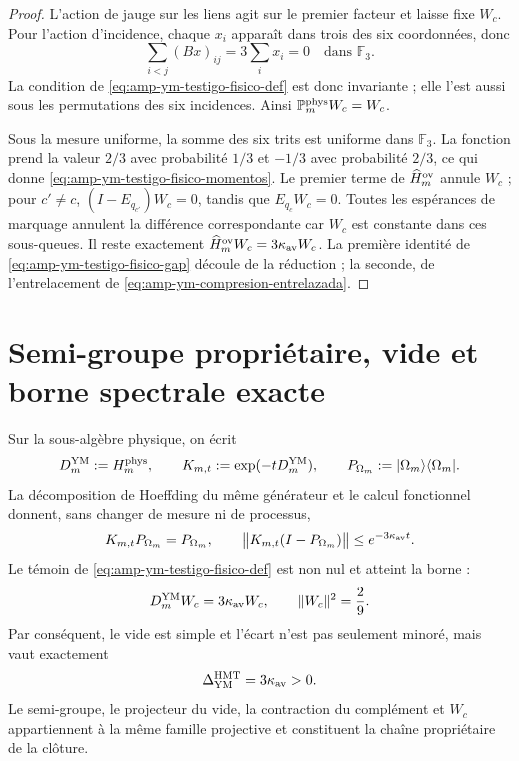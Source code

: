 \begin{proof}
L’action de jauge sur les liens agit sur le premier facteur et laisse fixe
\(W_c\). Pour l’action d’incidence, chaque \(x_i\) apparaît dans trois des
six coordonnées, donc
\[
 \sum_{i<j}(Bx)_{ij}=3\sum_i x_i=0
 \quad\text{dans }\mathbb F_3.
\]
La condition de \eqref{eq:amp-ym-testigo-fisico-def} est donc
invariante ; elle l’est aussi sous les permutations des six incidences.
Ainsi \(\mathbb P_m^{\rm phys}W_c=W_c\).

Sous la mesure uniforme, la somme des six trits est uniforme dans \(\mathbb F_3\). La fonction prend la valeur \(2/3\) avec probabilité \(1/3\) et \(-1/3\) avec probabilité \(2/3\), ce qui donne \eqref{eq:amp-ym-testigo-fisico-momentos}. Le premier terme de \(\widehat H_m^{\rm ov}\) annule \(W_c\) ; pour \(c'\ne c\), \((I-E_{q_{c'}})W_c=0\), tandis que \(E_{q_c}W_c=0\). Toutes les espérances de marquage annulent la différence correspondante car \(W_c\) est constante dans ces sous-queues. Il reste exactement \(\widehat H_m^{\rm ov}W_c=3\kappa_{\rm av}W_c\). La première identité de \eqref{eq:amp-ym-testigo-fisico-gap} découle de la réduction ; la seconde, de l'entrelacement de \eqref{eq:amp-ym-compresion-entrelazada}.
\end{proof}

\section*{Semi-groupe propriétaire, vide et borne spectrale exacte}

Sur la sous-algèbre physique, on écrit
\[
 D_m^{\rm YM}:=H_m^{\rm phys},\qquad
 K_{m,t}:=\exp(-tD_m^{\rm YM}),\qquad
 P_{\Omega_m}:=|\Omega_m\rangle\langle\Omega_m|.
\]
La décomposition de Hoeffding du même générateur et le calcul fonctionnel
donnent, sans changer de mesure ni de processus,
\begin{equation}\label{eq:amp-ym-owner-semigrupo-vacio}
 K_{m,t}P_{\Omega_m}=P_{\Omega_m},
 \qquad
 \bigl\|K_{m,t}(I-P_{\Omega_m})\bigr\|
 \leq e^{-3\kappa_{\rm av}t}.
\end{equation}
Le témoin de \eqref{eq:amp-ym-testigo-fisico-def} est non nul et atteint la
borne :
\begin{equation}\label{eq:amp-ym-owner-testigo-wc}
 D_m^{\rm YM}W_c=3\kappa_{\rm av}W_c,
 \qquad \|W_c\|^2=\frac29.
\end{equation}
Par conséquent, le vide est simple et l’écart n’est pas seulement minoré,
mais vaut exactement
\begin{equation}\label{eq:amp-ym-owner-brecha-exacta}
 \Delta_{\rm YM}^{\rm HMT}=3\kappa_{\rm av}>0.
\end{equation}
Le semi-groupe, le projecteur du vide, la contraction du complément et
\(W_c\) appartiennent à la même famille projective et constituent la chaîne
propriétaire de la clôture.

